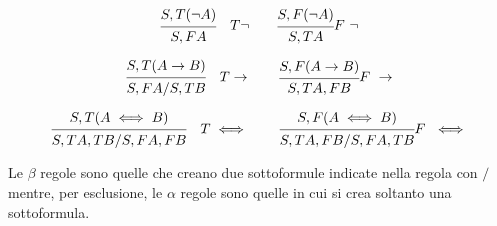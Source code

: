 \begin{equation*}
\begin{prooftree}
\hypo{S,T (\neg A)}
\infer1 {S,FA}
\end{prooftree}
\quad T \neg \qquad
\begin{prooftree}
\hypo{S,F (\neg A)}
\infer1 {S,TA}
\end{prooftree}
F \ \neg
\end{equation*}

\begin{equation*}
\begin{prooftree}
\hypo{S,T (A \rightarrow B)}
\infer1 {S,FA / S,TB}
\end{prooftree}
\quad T \rightarrow \qquad
\begin{prooftree}
\hypo{S,F (A \rightarrow B)}
\infer1 {S,TA,FB}
\end{prooftree}
F \ \rightarrow
\end{equation*}

\begin{equation*}
\begin{prooftree}
\hypo{S,T (A \iff B)}
\infer1 {S,TA,TB/S,FA,FB}
\end{prooftree}
\quad T \iff \qquad
\begin{prooftree}
\hypo{S,F (A \iff B)}
\infer1{S,TA,FB/S,FA,TB}
\end{prooftree}
F \ \iff
\end{equation*}

Le $\beta$ regole sono quelle che creano due sottoformule indicate nella regola con $/$
mentre, per esclusione, le $\alpha$ regole sono quelle in cui si crea soltanto una sottoformula.

